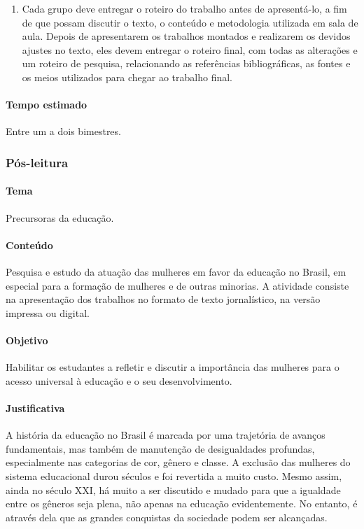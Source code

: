 \documentclass[12pt]{extarticle}
\begin{document}
\begin{enumerate}
\item
Cada grupo deve entregar o roteiro do trabalho antes de apresentá-lo,
a fim de que possam discutir o texto, o conteúdo e metodologia utilizada
em sala de aula. Depois de apresentarem os trabalhos montados e
realizarem os devidos ajustes no texto, eles devem entregar o roteiro
final, com todas as alterações e um roteiro de pesquisa, relacionando as
referências bibliográficas, as fontes e os meios utilizados para chegar
ao trabalho final.
\end{enumerate}

\paragraph{Tempo estimado} Entre um a dois bimestres.



\subsubsection{Pós-leitura}


\paragraph{Tema} Precursoras da educação.

\paragraph{Conteúdo} Pesquisa e estudo da atuação das mulheres em favor da
educação no Brasil, em especial para a formação de mulheres e de outras
minorias. A atividade consiste na apresentação dos trabalhos no formato
de texto jornalístico, na versão impressa ou digital.

\paragraph{Objetivo} Habilitar os estudantes a refletir e discutir a
importância das mulheres para o acesso universal à educação e o seu
desenvolvimento.

\paragraph{Justificativa} A história da educação no Brasil é marcada por
uma trajetória de avanços fundamentais, mas também de manutenção de
desigualdades profundas, especialmente nas categorias de cor, gênero e
classe. A exclusão das mulheres do sistema educacional durou séculos e
foi revertida a muito custo. Mesmo assim, ainda no século \textsc{XX}I, há muito
a ser discutido e mudado para que a igualdade entre os gêneros seja
plena, não apenas na educação evidentemente. No entanto, é através dela
que as grandes conquistas da sociedade podem ser alcançadas.
\end{document}
